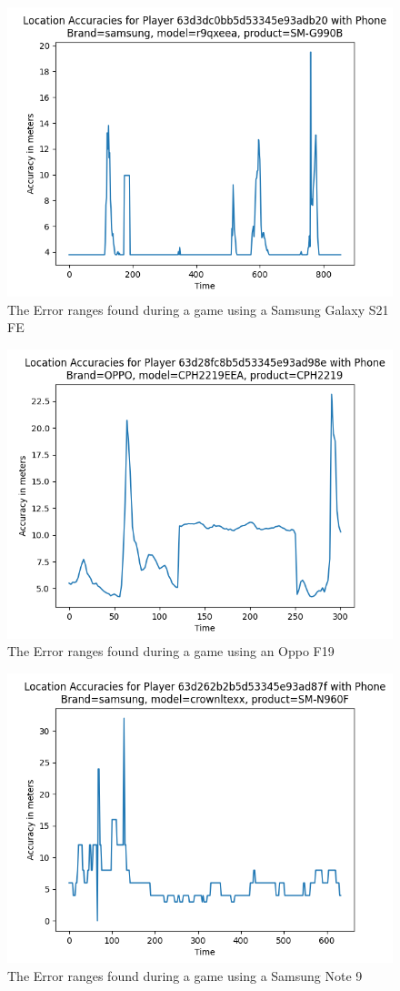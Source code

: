 \documentclass{l4proj}
\begin{document}
\begin{appendices}
\begin{figure}
    \centering
    \includegraphics[width=0.8\linewidth]{images/my_phone.png} 
    \caption{The Error ranges found during a game using a Samsung Galaxy S21 FE}
    \label{fig:galaxys21}
\end{figure}
\begin{figure}
    \centering
    \includegraphics[width=0.8\linewidth]{images/oppo.png}
    \caption{The Error ranges found during a game using an Oppo F19}
    \label{fig:oppo}
\end{figure}
\begin{figure}
    \centering
    \includegraphics[width=0.8\linewidth]{images/note9.png}
    \caption{The Error ranges found during a game using a Samsung Note 9}
    \label{fig:note9}
\end{figure}


\end{appendices}
\end{document}
